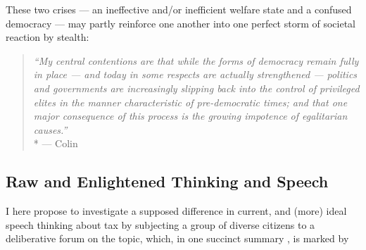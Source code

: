 These two crises --- an ineffective and/or inefficient welfare state and a confused democracy --- may partly reinforce one another into one perfect storm of societal reaction by stealth:
\begin{quote}
	\emph{
	``My central contentions are that while the forms of democracy remain fully in place --- and today in some respects are actually strengthened --- politics and governments are increasingly slipping back into the control of privileged elites in the manner characteristic of pre-democratic times;
	and that one major consequence of this process is the growing impotence of egalitarian causes.''}
	\\*
	--- Colin \citet[6]{Crouch2004}

\end{quote}

\subsection{Raw and Enlightened Thinking and Speech}

I here propose to investigate a supposed difference in current, and (more) ideal speech thinking about tax by subjecting a group of diverse citizens to a deliberative forum on the topic, which, in one succinct summary \cite[25ff]{Steenbergen2003}, is marked by

